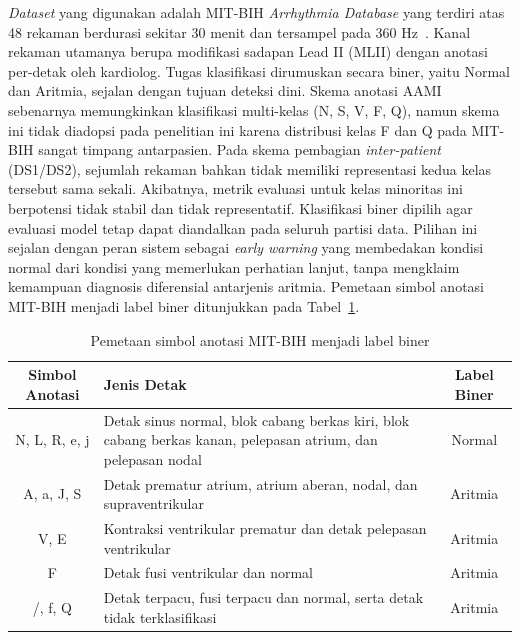 \textit{Dataset} yang digunakan adalah MIT-BIH \textit{Arrhythmia Database} yang terdiri atas 48 rekaman berdurasi sekitar 30 menit dan tersampel pada 360 Hz~\cite{moody_mark_2001}. Kanal rekaman utamanya berupa modifikasi sadapan Lead II (MLII) dengan anotasi per-detak oleh kardiolog. Tugas klasifikasi dirumuskan secara biner, yaitu Normal dan Aritmia, sejalan dengan tujuan deteksi dini. Skema anotasi AAMI sebenarnya memungkinkan klasifikasi multi-kelas (N, S, V, F, Q), namun skema ini tidak diadopsi pada penelitian ini karena distribusi kelas F dan Q pada MIT-BIH sangat timpang antarpasien. Pada skema pembagian \textit{inter-patient} (DS1/DS2), sejumlah rekaman bahkan tidak memiliki representasi kedua kelas tersebut sama sekali. Akibatnya, metrik evaluasi untuk kelas minoritas ini berpotensi tidak stabil dan tidak representatif. Klasifikasi biner dipilih agar evaluasi model tetap dapat diandalkan pada seluruh partisi data. Pilihan ini sejalan dengan peran sistem sebagai \textit{early warning} yang membedakan kondisi normal dari kondisi yang memerlukan perhatian lanjut, tanpa mengklaim kemampuan diagnosis diferensial antarjenis aritmia. Pemetaan simbol anotasi MIT-BIH menjadi label biner ditunjukkan pada Tabel~\ref{tab:pemetaan-label}.

\begin{table}[!ht]
  \centering
  \caption{Pemetaan simbol anotasi MIT-BIH menjadi label biner}
  \label{tab:pemetaan-label}
  \begin{tabular}{c>{\RaggedRight\arraybackslash}p{7.2cm}c}
    \toprule
    \textbf{Simbol Anotasi} & \textbf{Jenis Detak} & \textbf{Label Biner} \\
    \midrule
    N, L, R, e, j & Detak sinus normal, blok cabang berkas kiri, blok cabang berkas kanan, pelepasan atrium, dan pelepasan nodal & Normal \\
    A, a, J, S & Detak prematur atrium, atrium aberan, nodal, dan supraventrikular & Aritmia \\
    V, E & Kontraksi ventrikular prematur dan detak pelepasan ventrikular & Aritmia \\
    F & Detak fusi ventrikular dan normal & Aritmia \\
    /, f, Q & Detak terpacu, fusi terpacu dan normal, serta detak tidak terklasifikasi & Aritmia \\
    \bottomrule
  \end{tabular}
\end{table}

